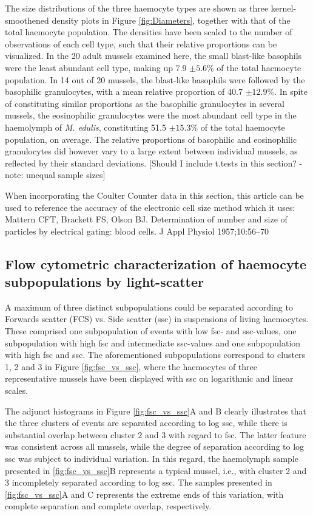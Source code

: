 The size distributions of the three haemocyte types are shown as three kernel-smoothened density plots in Figure \ref{fig:Diameters}, together with that of the total haemocyte population. The densities have been scaled to the number of observations of each cell type, such that their relative proportions can be visualized. In the 20 adult mussels examined here, the small blast-like basophils were the least abundant cell type, making up 7.9 $\pm{5.6}$\% of the total haemocyte population. In 14 out of 20 mussels, the blast-like basophils were followed by the basophilic granulocytes, with a mean relative proportion of 40.7 $\pm{12.9}$\%. In spite of constituting similar proportions as the basophilic granulocytes in several mussels, the eosinophilic granulocytes were the most abundant cell type in the haemolymph of \emph{M. edulis}, constituting 51.5 $\pm{15.3}$\% of the total haemocyte population, on average. The relative proportions of basophilic and eosinophilic granulocytes did however vary to a large extent between individual mussels, as reflected by their standard deviations. [Should I include t.tests in this section? - note: unequal sample sizes]

When incorporating the Coulter Counter data in this section, this article can be used to reference the accuracy of the electronic cell size method which it uses: Mattern CFT, Brackett FS, Olson BJ. Determination of number and size of particles by electrical gating: blood cells. J Appl Physiol 1957;10:56–70


\subsection{Flow cytometric characterization of haemocyte subpopulations by light-scatter}
\label{subsection:Results_FlowChar}
A maximum of three distinct subpopulations could be separated according to Forwards scatter (FCS) vs. Side scatter (\acrshort{ssc}) in suspensions of living haemocytes. These comprised one subpopulation of events with low \acrshort{fsc}- and \acrshort{ssc}-values, one subpopulation with high \acrshort{fsc} and intermediate \acrshort{ssc}-values and one subpopulation with high \acrshort{fsc} and \acrshort{ssc}. The aforementioned subpopulations correspond to clusters 1, 2 and 3 in Figure \ref{fig:fsc_vs_ssc}, where the haemocytes of three representative mussels have been displayed with \acrshort{ssc} on logarithmic and linear scales.

The adjunct histograms in Figure \ref{fig:fsc_vs_ssc}A and B clearly illustrates that the three clusters of events are separated according to log \acrshort{ssc}, while there is substantial overlap between cluster 2 and 3 with regard to \acrshort{fsc}. The latter feature was consistent across all mussels, while the degree of separation according to log \acrshort{ssc} was subject to individual variation. In this regard, the haemolymph sample presented in \ref{fig:fsc_vs_ssc}B represents a typical mussel, i.e., with cluster 2 and 3 incompletely separated according to log \acrshort{ssc}. The samples presented in \ref{fig:fsc_vs_ssc}A and C represents the extreme ends of this variation, with complete separation and complete overlap, respectively.

